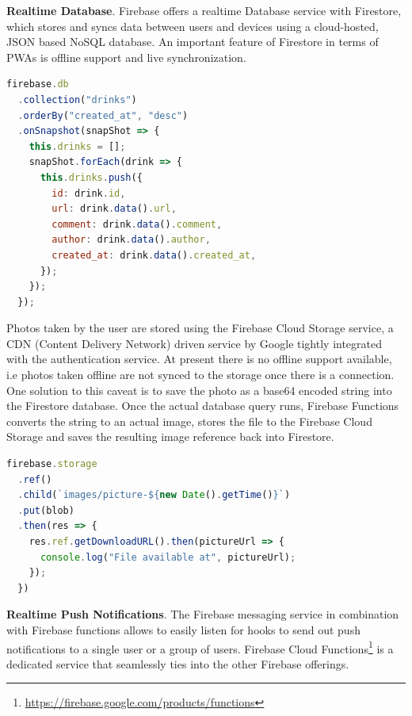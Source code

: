 \textbf{Realtime Database}. Firebase offers a realtime Database service with Firestore, which stores and syncs data between users and devices using a cloud-hosted, JSON based NoSQL database. An important feature of Firestore in terms of PWAs is offline support and live synchronization.

\begin{lstlisting}[language=JavaScript, caption=Realtime query for new posts (Home.vue), label=lst:firebase-listposts]
firebase.db
  .collection("drinks")
  .orderBy("created_at", "desc")
  .onSnapshot(snapShot => {
    this.drinks = [];
    snapShot.forEach(drink => {
      this.drinks.push({
        id: drink.id,
        url: drink.data().url,
        comment: drink.data().comment,
        author: drink.data().author,
        created_at: drink.data().created_at,
      });
    });
  });
\end{lstlisting}

Photos taken by the user are stored using the Firebase Cloud Storage service, a CDN (Content Delivery Network) driven service by Google tightly integrated with the authentication service. At present there is no offline support available, i.e photos taken offline are not synced to the storage once there is a connection. One solution to this caveat is to save the photo as a base64 encoded string into the Firestore database. Once the actual database query runs, Firebase Functions converts the string to an actual image, stores the file to the Firebase Cloud Storage and saves the resulting image reference back into Firestore.

\begin{lstlisting}[language=JavaScript, caption=Store a photo to Firebase Cloud Storage (Camera.vue), label=lst:firebase-photos]
firebase.storage
  .ref()
  .child(`images/picture-${new Date().getTime()}`)
  .put(blob)
  .then(res => {
    res.ref.getDownloadURL().then(pictureUrl => {
      console.log("File available at", pictureUrl);
    });
  })
\end{lstlisting}

\textbf{Realtime Push Notifications}. The Firebase messaging service in combination with Firebase functions allows to easily listen for hooks to send out push notifications to a single user or a group of users. Firebase Cloud Functions\footnote{\url{https://firebase.google.com/products/functions}} is a dedicated service that seamlessly ties into the other Firebase offerings.

